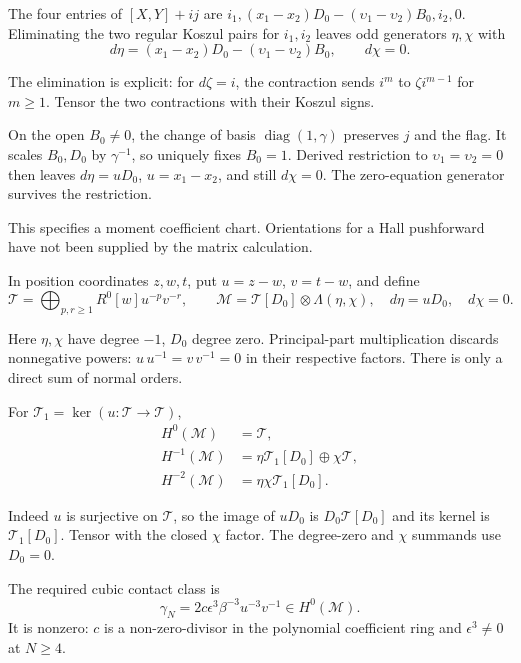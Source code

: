 The four entries of $[X,Y]+ij$ are
$i_1,(x_1-x_2)D_0-(\upsilon_1-\upsilon_2)B_0,i_2,0$.
Eliminating the two regular Koszul pairs for $i_1,i_2$
leaves odd generators $\eta,\chi$ with
\[
 d\eta=(x_1-x_2)D_0-(\upsilon_1-\upsilon_2)B_0,\qquad d\chi=0.
\]

The elimination is explicit: for $d\zeta=i$, the
contraction sends $i^m$ to $\zeta i^{m-1}$ for $m\geq1$.
Tensor the two contractions with their Koszul signs.

On the open $B_0\ne0$, the change of basis
$\operatorname{diag}(1,\gamma)$ preserves $j$ and the flag.
It scales $B_0,D_0$ by $\gamma^{-1}$, so uniquely fixes $B_0=1$.
Derived restriction to
$\upsilon_1=\upsilon_2=0$ then leaves $d\eta=uD_0$,
$u=x_1-x_2$, and still $d\chi=0$.
The zero-equation generator survives the restriction.

This specifies a moment coefficient chart. Orientations
for a Hall pushforward have not been supplied by the
matrix calculation.

In position coordinates $z,w,t$, put $u=z-w$, $v=t-w$,
and define
\begin{equation}\label{v4-arith:curve:eq:moment-module}
 \mathcal T=\bigoplus_{p,r\geq1}R^0[w]u^{-p}v^{-r},
 \qquad
 \mathcal M=\mathcal T[D_0]\otimes\Lambda(\eta,\chi),
 \quad d\eta=uD_0,\quad d\chi=0 .
\end{equation}

Here $\eta,\chi$ have degree $-1$, $D_0$ degree zero.
Principal-part multiplication discards nonnegative powers:
$u\,u^{-1}=v\,v^{-1}=0$ in their respective factors.
There is only a direct sum of normal orders.

For $\mathcal T_1=\ker(u:\mathcal T\to\mathcal T)$,
\begin{equation}\label{v4-arith:curve:eq:moment-cohomology}
 \begin{aligned}
 H^0(\mathcal M)&=\mathcal T,\\
 H^{-1}(\mathcal M)&=\eta\mathcal T_1[D_0]\oplus\chi\mathcal T,\\
 H^{-2}(\mathcal M)&=\eta\chi\mathcal T_1[D_0].
 \end{aligned}
\end{equation}

Indeed $u$ is surjective on $\mathcal T$, so the image
of $uD_0$ is $D_0\mathcal T[D_0]$ and its kernel is
$\mathcal T_1[D_0]$. Tensor with the closed $\chi$ factor.
The degree-zero and $\chi$ summands use $D_0=0$.

The required cubic contact class is
\begin{equation}\label{v4-arith:curve:eq:framing-contact}
 \gamma_N=2c\epsilon^3\beta^{-3}u^{-3}v^{-1}
                    \in H^0(\mathcal M).
\end{equation}
It is nonzero: $c$ is a non-zero-divisor in the polynomial
coefficient ring and $\epsilon^3\ne0$ at $N\geq4$.

